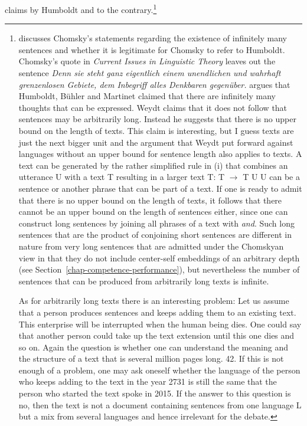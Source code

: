 claims by Humboldt and \citet[]{Chomsky2008a} to the contrary.\footnote{%
  \citet{Weydt72a} discusses Chomsky's statements regarding the existence of infinitely many
  sentences and whether it is legitimate for Chomsky to refer to Humboldt. Chomsky's quote in
  \emph{Current Issues in Linguistic Theory} \citep[]{Chomsky64b-u} leaves out the sentence
  \emph{Denn sie steht ganz eigentlich einem unendlichen und wahrhaft grenzenlosen Gebiete, dem
    Inbegriff alles Denkbaren gegenüber.} \citet[]{Weydt72a} argues that 
  Humboldt, Bühler and Martinet claimed that
  there are infinitely many thoughts that can be expressed. Weydt
  claims that it does not follow that sentences may be arbitrarily long. Instead he suggests that
  there is no upper bound on the length of texts. This claim is interesting, but I guess texts are
  just the next bigger unit and the argument that Weydt put forward against languages without an
  upper bound for sentence length also applies to texts. A text can be generated by the rather
  simplified rule in (i) that combines an utterance U with a text T resulting in a larger text T:
  \ea
  T $\to$ T U
  \z
  U can be a sentence or another phrase that can be part of a text. If one is ready to admit that
  there is no upper bound on the length of texts, it follows that there cannot be an upper bound on
  the length of sentences either, since one can construct long sentences by joining all phrases of a
  text with \emph{and}. Such long sentences that are the product of conjoining short sentences are different in nature from very long sentences that are admitted under the
  Chomskyan view in that they do not include center-self embeddings of an
  arbitrary depth (see Section~\ref{chap-competence-performance}), but nevertheless the number of
  sentences that can be produced from arbitrarily long texts is infinite.

  As for arbitrarily long texts there is an interesting problem: Let us assume that a person
  produces sentences and keeps adding them to an existing text. This enterprise will be interrupted
  when the human being dies. One could say that another person could take up the text extension
  until this one dies and so on. Again the question is whether one can understand the meaning and the structure
  of a text that is several million pages long. 42. If this is not enough of a problem, one may ask
  oneself whether the language of the person who keeps adding to the text in the year 2731 is still
  the same that the person who started the text spoke in 2015. If the answer to this question is no,
  then the text is not a document containing sentences from one language L but a mix from several
  languages and hence irrelevant for the debate. 
} 

